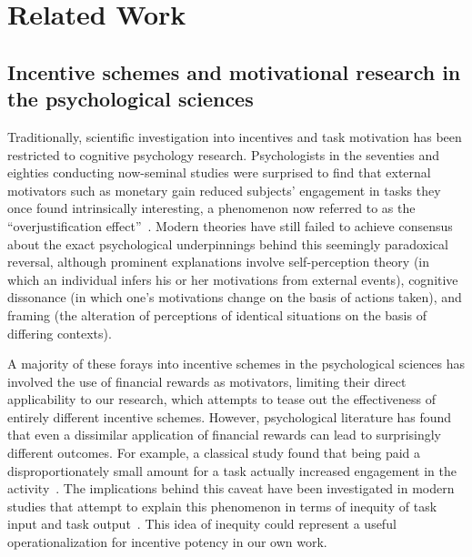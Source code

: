 \section{Related Work}

\subsection{Incentive schemes and motivational research in the psychological sciences}
Traditionally, scientific investigation into incentives and task motivation has been restricted to cognitive psychology research. Psychologists in the seventies and eighties conducting now-seminal studies were surprised to find that external motivators such as monetary gain reduced subjects’ engagement in tasks they once found intrinsically interesting, a phenomenon now referred to as the “overjustification effect”~\cite{lepper1973undermining}. Modern theories have still failed to achieve consensus about the exact psychological underpinnings behind this seemingly paradoxical reversal, although prominent explanations involve self-perception theory (in which an individual infers his or her motivations from external events), cognitive dissonance (in which one’s motivations change on the basis of actions taken), and framing (the alteration of perceptions of identical situations on the basis of differing contexts).

A majority of these forays into incentive schemes in the psychological sciences has involved the use of financial rewards as motivators, limiting their direct applicability to our research, which attempts to tease out the effectiveness of entirely different incentive schemes. However, psychological literature has found that even a dissimilar application of financial rewards can lead to surprisingly different outcomes. For example, a classical study found that being paid a disproportionately small amount for a task actually increased engagement in the activity~\cite{rosenfield1980rewards}. The implications behind this caveat have been investigated in modern studies that attempt to explain this phenomenon in terms of inequity of task input and task output~\cite{Ryan00}. This idea of inequity could represent a useful operationalization for incentive potency in our own work.

